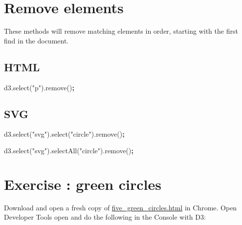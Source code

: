 \documentclass[openany]{book}
\newenvironment{Shaded}{\begin{snugshade}}{\end{snugshade}}
\newcommand{\AttributeTok}[1]{\textcolor[rgb]{0.77,0.63,0.00}{#1}}
\newcommand{\NormalTok}[1]{#1}
\newcommand{\OperatorTok}[1]{\textcolor[rgb]{0.81,0.36,0.00}{\textbf{#1}}}
\newcommand{\StringTok}[1]{\textcolor[rgb]{0.31,0.60,0.02}{#1}}
\newcommand{\VariableTok}[1]{\textcolor[rgb]{0.00,0.00,0.00}{#1}}
\begin{document}
\hypertarget{remove-elements}{%
\section{Remove elements }\label{remove-elements}}

These methods will remove matching elements in order, starting with the first find in the document.

\hypertarget{html-2}{%
\subsection{HTML}\label{html-2}}

\begin{Shaded}
\begin{Highlighting}[]
\VariableTok{d3}\NormalTok{.}\AttributeTok{select}\NormalTok{(}\StringTok{"p"}\NormalTok{).}\AttributeTok{remove}\NormalTok{()}\OperatorTok{;}
\end{Highlighting}
\end{Shaded}

\hypertarget{svg-2}{%
\subsection{SVG}\label{svg-2}}

\begin{Shaded}
\begin{Highlighting}[]
\VariableTok{d3}\NormalTok{.}\AttributeTok{select}\NormalTok{(}\StringTok{"svg"}\NormalTok{).}\AttributeTok{select}\NormalTok{(}\StringTok{"circle"}\NormalTok{).}\AttributeTok{remove}\NormalTok{()}\OperatorTok{;}

\VariableTok{d3}\NormalTok{.}\AttributeTok{select}\NormalTok{(}\StringTok{"svg"}\NormalTok{).}\AttributeTok{selectAll}\NormalTok{(}\StringTok{"circle"}\NormalTok{).}\AttributeTok{remove}\NormalTok{()}\OperatorTok{;}
\end{Highlighting}
\end{Shaded}

\hypertarget{exercise-green-circles}{%
\section{Exercise : green circles}\label{exercise-green-circles}}

Download and open a fresh copy of \href{https://raw.githubusercontent.com/jtr13/d3book/master/code/five_green_circles.html}{five\_green\_circles.html} in Chrome. Open Developer Tools open and do the following in the Console with D3:
\end{document}
